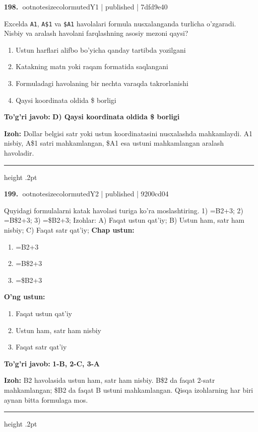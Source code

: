 \documentclass[10pt,a4paper]{article}
\begin{document}
\textbf{\color{ink}198.} {ootnotesizecolor{muted}Y1 | published | 7dfd9e40}
\par
Excelda \texttt{A1}, \texttt{A\$1} va \texttt{\$A1} havolalari formula nusxalanganda turlicha o'zgaradi. Nisbiy va aralash havolani farqlashning asosiy mezoni qaysi?
\begin{enumerate}[label=\Alph*),leftmargin=9mm]
\item Ustun harflari alifbo bo'yicha qanday tartibda yozilgani
\item Katakning matn yoki raqam formatida saqlangani
\item Formuladagi havolaning bir nechta varaqda takrorlanishi
\item Qaysi koordinata oldida \$ borligi
\end{enumerate}
\begin{tcolorbox}[enhanced,breakable,colback=teal!4,colframe=teal!55!black,boxrule=0.45pt,arc=1.2mm,left=2.8mm,right=2.8mm,top=2mm,bottom=2mm]
\textbf{\color{teal}To'g'ri javob:} \textbf{D) Qaysi koordinata oldida \$ borligi}
\par\smallskip
\textbf{Izoh:} Dollar belgisi satr yoki ustun koordinatasini nusxalashda mahkamlaydi. A1 nisbiy, A\$1 satri mahkamlangan, \$A1 esa ustuni mahkamlangan aralash havoladir.
\end{tcolorbox}
\vspace{2mm}\hrule height .2pt\vspace{2mm}

\textbf{\color{ink}199.} {ootnotesizecolor{muted}Y2 | published | 9200cd04}
\par
Quyidagi formulalarni katak havolasi turiga ko'ra moslashtiring. 1) =B2+3; 2) =B\$2+3; 3) =\$B2+3; Izohlar: A) Faqat ustun qat'iy; B) Ustun ham, satr ham nisbiy; C) Faqat satr qat'iy;
\textbf{Chap ustun:}\begin{enumerate}[label=\arabic*),leftmargin=9mm]
\item =B2+3
\item =B\$2+3
\item =\$B2+3
\end{enumerate}
\textbf{O'ng ustun:}\begin{enumerate}[label=\Alph*),leftmargin=9mm]
\item Faqat ustun qat'iy
\item Ustun ham, satr ham nisbiy
\item Faqat satr qat'iy
\end{enumerate}
\begin{tcolorbox}[enhanced,breakable,colback=teal!4,colframe=teal!55!black,boxrule=0.45pt,arc=1.2mm,left=2.8mm,right=2.8mm,top=2mm,bottom=2mm]
\textbf{\color{teal}To'g'ri javob:} \textbf{1-B, 2-C, 3-A}
\par\smallskip
\textbf{Izoh:} B2 havolasida ustun ham, satr ham nisbiy. B\$2 da faqat 2-satr mahkamlangan; \$B2 da faqat B ustuni mahkamlangan. Qisqa izohlarning har biri aynan bitta formulaga mos.
\end{tcolorbox}
\vspace{2mm}\hrule height .2pt\vspace{2mm}
\end{document}
